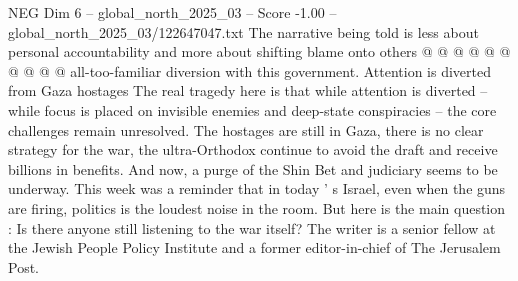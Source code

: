 \begin{textsample}{NEG Dim 6 – global\_north\_2025\_03 – Score -1.00 – global\_north\_2025\_03/122647047.txt}
The narrative being told is less about personal accountability and more about shifting blame onto others @ @ @ @ @ @ @ @ @ @ all-too-familiar diversion with this government.
Attention is diverted from Gaza hostages The real tragedy here is that while attention is diverted -- while focus is placed on invisible enemies and deep-state conspiracies -- the core challenges remain unresolved.
The hostages are still in Gaza, there is no clear strategy for the war, the ultra-Orthodox continue to avoid the draft and receive billions in benefits.
And now, a purge of the Shin Bet and judiciary seems to be underway.
This week was a reminder that in today ' s Israel, even when the guns are firing, politics is the loudest noise in the room.
But here is the main question : Is there anyone still listening to the war itself?
The writer is a senior fellow at the Jewish People Policy Institute and a former editor-in-chief of The Jerusalem Post.

\end{textsample}

